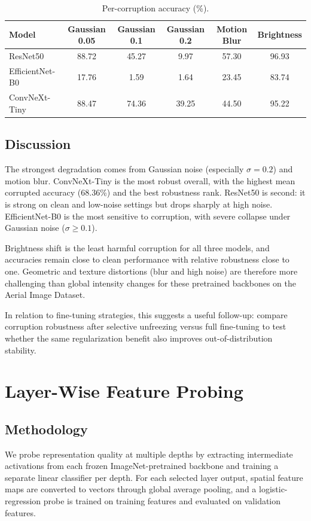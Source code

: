 \documentclass[11pt,a4paper]{article}
\begin{document}
\begin{table}[H]
	\centering
	\caption{Per-corruption accuracy (\%).}
	\begin{tabular}{lccccc}
		\toprule
		Model & Gaussian 0.05 & Gaussian 0.1 & Gaussian 0.2 & Motion Blur & Brightness \\
		\midrule
		ResNet50 & 88.72 & 45.27 & 9.97 & 57.30 & 96.93 \\
		EfficientNet-B0 & 17.76 & 1.59 & 1.64 & 23.45 & 83.74 \\
		ConvNeXt-Tiny & 88.47 & 74.36 & 39.25 & 44.50 & 95.22 \\
		\bottomrule
	\end{tabular}
\end{table}

\subsection{Discussion}
The strongest degradation comes from Gaussian noise (especially $\sigma=0.2$) and motion blur. ConvNeXt-Tiny is the most robust overall, with the highest mean corrupted accuracy (68.36\%) and the best robustness rank. ResNet50 is second: it is strong on clean and low-noise settings but drops sharply at high noise. EfficientNet-B0 is the most sensitive to corruption, with severe collapse under Gaussian noise ($\sigma\ge 0.1$).

Brightness shift is the least harmful corruption for all three models, and accuracies remain close to clean performance with relative robustness close to one. Geometric and texture distortions (blur and high noise) are therefore more challenging than global intensity changes for these pretrained backbones on the Aerial Image Dataset.

In relation to fine-tuning strategies, this suggests a useful follow-up: compare corruption robustness after selective unfreezing versus full fine-tuning to test whether the same regularization benefit also improves out-of-distribution stability.

\section{Layer-Wise Feature Probing}
\subsection{Methodology}
We probe representation quality at multiple depths by extracting intermediate activations from each frozen ImageNet-pretrained backbone and training a separate linear classifier per depth. For each selected layer output, spatial feature maps are converted to vectors through global average pooling, and a logistic-regression probe is trained on training features and evaluated on validation features.
\end{document}
